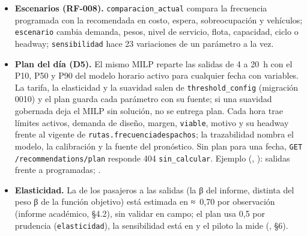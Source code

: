 \documentclass[10pt,a4paper]{article}
\begin{document}
\begin{itemize}
  \OcupPersistencia~\% de \OcupDisparos{} casos (base, \OcupTasaBase~\%); con los viajes aún en curso, a las
  \OcupCorteTiempoReal{} siguen \OcupDisparosTiempoReal{} de ellos.
\item \textbf{Escenarios (RF-008).} \texttt{comparacion\_actual} compara la frecuencia programada con la recomendada en
  costo, espera, sobreocupación y vehículos; \texttt{escenario} cambia demanda, pesos, nivel de servicio, flota,
  capacidad, ciclo o headway; \texttt{sensibilidad} hace 23 variaciones de un parámetro a la vez.
\item \textbf{Plan del día (D5).} El mismo MILP reparte las salidas de 4 a 20~h con el P10, P50 y P90 del modelo
  horario activo para cualquier fecha con variables. La tarifa, la elasticidad y la suavidad salen de \texttt{threshold\_config} (migración 0010) y el plan guarda cada
  parámetro con su fuente; si una suavidad gobernada deja el MILP sin solución, no se entrega plan. Cada hora trae
  límites activos, demanda de diseño, margen, \texttt{viable}, motivo y su headway frente al vigente de
  \texttt{rutas.frecuenciadespachos}; la trazabilidad nombra el modelo, la calibración y la fuente del pronóstico. Sin
  plan para una fecha, \texttt{GET /recommendations/plan} responde 404 \texttt{sin\_calcular}. Ejemplo (\RespEjRuta,
  \RespuestaFecha): \RespEjSalidas{} salidas frente a \RespEjProgramadas{} programadas; \RespEjNoViables.
\item \textbf{Elasticidad.} La de los pasajeros a las salidas (la β del informe, distinta del peso β de la función
  objetivo) está estimada en ≈~0,70 por observación (informe académico, §4.2), sin validar en campo; el plan usa 0,5
  por prudencia (\texttt{elasticidad}), la sensibilidad está en  y el piloto la
  mide (, §6).
\end{itemize}

\end{document}
